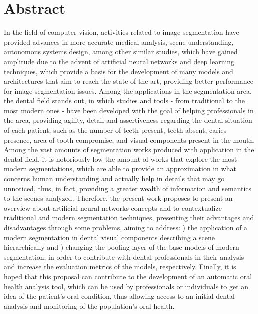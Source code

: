 \section*{Abstract}
In the field of computer vision, activities related to image segmentation have provided advances in more accurate medical analysis, scene understanding, autonomous systems design, among other similar studies, which have gained amplitude due to the advent of artificial neural networks and deep learning techniques, which provide a basis for the development of many models and architectures that aim to reach the state-of-the-art, providing better performance for image segmentation issues.
Among the applications in the segmentation area, the dental field stands out, in which studies and tools - from traditional to the most modern ones - have been developed with the goal of helping professionals in the area, providing agility, detail and assertiveness regarding the dental situation of each patient, such as the number of teeth present, teeth absent, caries presence, area of tooth compromise, and visual components present in the mouth. 
Among the vast amounts of segmentation works produced with application in the dental field,  it is notoriously low the amount of works that explore the most modern segmentations, which are able to provide an approximation in what concerns human understanding and actually help in details that may go unnoticed, thus, in fact, providing a greater wealth of information and semantics to the scenes analyzed.
Therefore, the present work proposes to present an overview about artificial neural networks concepts and to contextualize traditional and modern segmentation techniques, presenting their advantages and disadvantages through some problems, aiming to address: ) the application of a modern segmentation in dental visual components describing a scene hierarchically and ) changing the pooling layer of the base models of modern segmentation, in order to contribute with dental professionals in their analysis and increase the evaluation metrics of the models, respectively.
Finally, it is hoped that this proposal can contribute to the development of an automatic oral health analysis tool, which can be used by professionals or individuals to get an idea of the patient's oral condition, thus allowing access to an initial dental analysis and monitoring of the population's oral health.